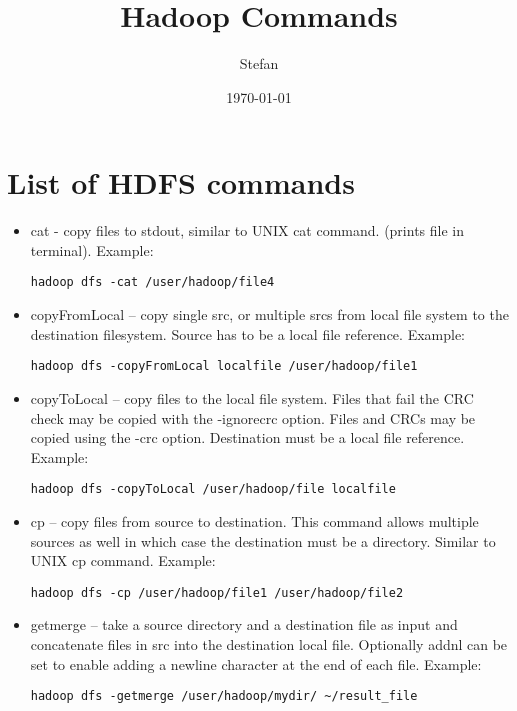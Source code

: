 \documentclass[12pt,a4paper]{article}
\title{Hadoop Commands}
\author{Stefan}
\date{\today}
\begin{document}
\maketitle

\section{List of HDFS commands}
\begin{itemize}

\item cat - copy files to stdout, similar to UNIX cat command. (prints file in terminal). Example:
\begin{verbatim}
hadoop dfs -cat /user/hadoop/file4
\end{verbatim}

\item copyFromLocal – copy single src, or multiple srcs from local file system to the destination filesystem. Source has to be a local file reference. Example:
\begin{verbatim}
hadoop dfs -copyFromLocal localfile /user/hadoop/file1
\end{verbatim}

\item copyToLocal – copy files to the local file system. Files that fail the CRC check may be copied with the -ignorecrc option. Files and CRCs may be copied using the -crc option. Destination
must be a local file reference. Example:
\begin{verbatim}
hadoop dfs -copyToLocal /user/hadoop/file localfile
\end{verbatim}

\item cp – copy files from source to destination. This command allows multiple sources as well in which case the destination must be a directory. Similar to UNIX cp command. Example:
\begin{verbatim}
hadoop dfs -cp /user/hadoop/file1 /user/hadoop/file2
\end{verbatim}

\item getmerge – take a source directory and a destination file as input and concatenate files in src into the destination local file. Optionally addnl can be set to enable adding a newline character at the end of each file. Example:
\begin{verbatim}
hadoop dfs -getmerge /user/hadoop/mydir/ ~/result_file
\end{verbatim}


\end{itemize}
\end{document}
